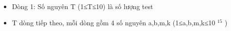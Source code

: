 \begin{itemize}
	\item     Dòng 1: Số nguyên T (1≤T≤10) là số lượng test   
	\item     T dòng tiếp theo, mỗi dòng gồm 4 số nguyên a,b,m,k (1≤a,b,m,k≤10    $^     15    $    )   
\end{itemize}